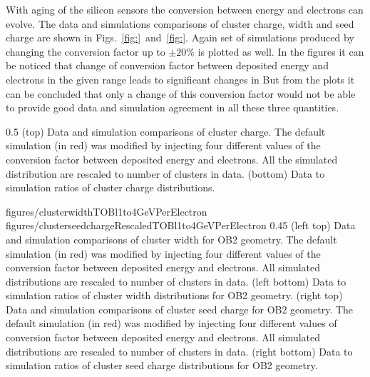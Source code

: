 
With aging of the silicon sensors the conversion between energy and electrons can evolve. The data and simulations comparisons of cluster charge, width and seed charge are shown in Figs.~\ref{fig:}~and~\ref{fig:}. Again set of simulations produced by changing the conversion factor up to $\pm 20\%$ is plotted as well. In the figures it can be noticed that change of conversion factor between deposited energy and electrons in the given range leads to significant changes in  But from the plots it can be concluded that only a change of this conversion factor would not be able to provide good data and simulation agreement in all these three quantities.

                 {0.5}       %
                 { (top) Data and simulation comparisons of cluster charge. The default simulation (in red) was modified by injecting four different values of the conversion factor between deposited energy and electrons. All the simulated distribution are rescaled to number of clusters in data. (bottom) Data to simulation ratios of cluster charge distributions. }

                 {figures/clusterwidthTOBl1to4GeVPerElectron}
                 {figures/clusterseedchargeRescaledTOBl1to4GeVPerElectron} %
                 {0.45}       %
                 {(left top) Data and simulation  comparisons of cluster width for OB2 geometry. The default simulation (in red) was modified by injecting four different values of the conversion factor between deposited energy and electrons. All simulated distributions are rescaled to number of clusters in data. (left bottom) Data to simulation ratios of cluster width distributions for OB2 geometry. (right top) Data and simulation  comparisons of cluster seed charge for OB2 geometry. The default simulation (in red) was modified by injecting four different values of conversion factor between deposited energy and electrons. All simulated distributions are rescaled to number of clusters in data. (right bottom) Data to simulation ratios of cluster seed charge distributions for OB2 geometry. }

